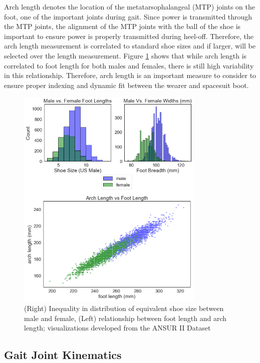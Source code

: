\documentclass[defaultstyle,11pt]{comps}
\begin{document}
Arch length denotes the location of the metatarsophalangeal (MTP) joints on the foot, one of the important joints during gait.
Since power is transmitted through the MTP joints, the alignment of the MTP joints with the ball of the shoe is important to ensure power is properly transmitted during heel-off.
Therefore, the arch length measurement is correlated to standard shoe sizes and if larger, will be selected over the length measurement.
Figure \ref{fig:SA3-ANSUR} shows that while arch length is correlated to foot length for both males and females, there is still high variability in this relationship.
Therefore, arch length is an important measure to consider to ensure proper indexing and dynamic fit between the wearer and spacesuit boot.

\begin{figure}
\hypertarget{fig:SA3-ANSUR}{%
\centering
\includegraphics[width=0.8\textwidth,height=\textheight]{../fig/SA3/ANSUR.png}
\caption{(Right) Inequality in distribution of equivalent shoe size between male and female, (Left) relationship between foot length and arch length; visualizations developed from the ANSUR II Dataset}\label{fig:SA3-ANSUR}
}
\end{figure}

\hypertarget{gait-joint-kinematics}{%
\subsection{Gait Joint Kinematics}\label{gait-joint-kinematics}}
\end{document}
